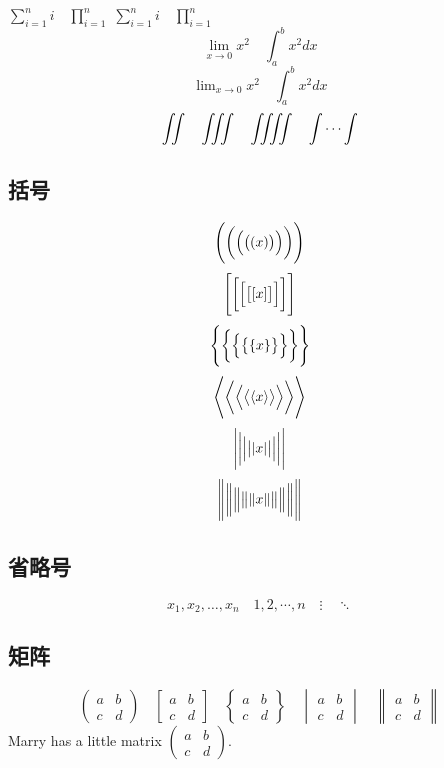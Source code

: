\documentclass[UTF8]{ctexart}
\begin{document}
$ \sum_{i=1}^n i\quad \prod_{i=1}^n $
$ \sum\limits _{i=1}^n i\quad \prod\limits _{i=1}^n $
\[ \lim_{x\to0}x^2 \quad \int_a^b x^2 dx \]
\[ \lim\nolimits _{x\to0}x^2\quad \int\nolimits_a^b x^2 dx \]
\[ \iint\quad \iiint\quad \iiiint\quad \idotsint \]

\subsection{括号}
\[ \Biggl(\biggl(\Bigl(\bigl((x)\bigr)\Bigr)\biggr)\Biggr) \]
\[ \Biggl[\biggl[\Bigl[\bigl[[x]\bigr]\Bigr]\biggr]\Biggr] \]
\[ \Biggl \{\biggl \{\Bigl \{\bigl \{\{x\}\bigr \}\Bigr \}\biggr \}\Biggr\} \]
\[ \Biggl\langle\biggl\langle\Bigl\langle\bigl\langle\langle x
\rangle\bigr\rangle\Bigr\rangle\biggr\rangle\Biggr\rangle \]
\[ \Biggl\lvert\biggl\lvert\Bigl\lvert\bigl\lvert\lvert x
\rvert\bigr\rvert\Bigr\rvert\biggr\rvert\Biggr\rvert \]
\[ \Biggl\lVert\biggl\lVert\Bigl\lVert\bigl\lVert\lVert x
\rVert\bigr\rVert\Bigr\rVert\biggr\rVert\Biggr\rVert \]

\subsection{省略号}
 \[ x_1,x_2,\dots ,x_n\quad 1,2,\cdots ,n\quad
\vdots\quad \ddots \]

\subsection{矩阵}
\[ \begin{pmatrix} a&b\\c&d \end{pmatrix} \quad
\begin{bmatrix} a&b\\c&d \end{bmatrix} \quad
\begin{Bmatrix} a&b\\c&d \end{Bmatrix} \quad
\begin{vmatrix} a&b\\c&d \end{vmatrix} \quad
\begin{Vmatrix} a&b\\c&d \end{Vmatrix} \]
Marry has a little matrix $ ( \begin{smallmatrix} a&b\\c&d \end{smallmatrix} ) $.
\end{document}

